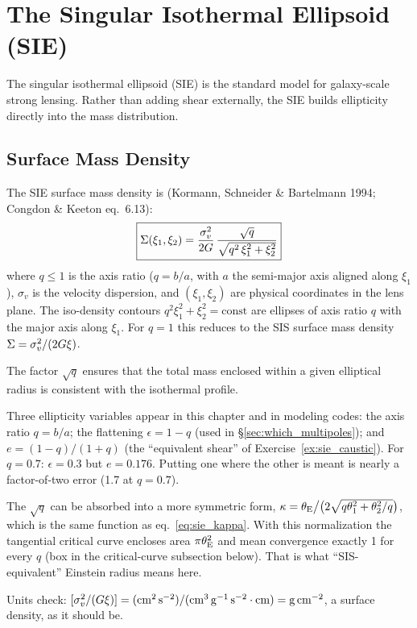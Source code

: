 \section{The Singular Isothermal Ellipsoid (SIE)}
\label{sec:sie}

The singular isothermal ellipsoid (SIE) is the standard
model for galaxy-scale strong lensing.  Rather than adding shear
externally, the SIE builds ellipticity directly into the mass
distribution.

\subsection{Surface Mass Density}

The SIE surface mass density is
(Kormann, Schneider \& Bartelmann 1994; Congdon \& Keeton eq.~6.13):
\begin{equation}
    \boxed{
    \Sigma(\xi_1, \xi_2)
    = \frac{\sigma_v^2}{2G}
    \,\frac{\sqrt{q}}{\sqrt{q^2\,\xi_1^2 + \xi_2^2}}
    }
    \label{eq:sie_sigma}
\end{equation}
where $q \leq 1$ is the axis ratio ($q = b/a$, with $a$ the
semi-major axis aligned along $\xi_1$), $\sigma_v$ is the velocity
dispersion, and $(\xi_1, \xi_2)$ are physical coordinates in the
lens plane.  The iso-density contours $q^2\xi_1^2 + \xi_2^2 =
\mathrm{const}$ are ellipses of axis ratio $q$ with the major axis
along $\xi_1$.  For $q = 1$ this reduces to the SIS surface mass
density $\Sigma = \sigma_v^2/(2G\xi)$.

The factor $\sqrt{q}$ ensures that the total mass enclosed within a
given elliptical radius is consistent with the isothermal profile.

\begin{annotation}
Three ellipticity variables appear in this chapter and in modeling codes: the
axis ratio $q = b/a$; the flattening $\epsilon = 1-q$ (used in
\S\ref{sec:which_multipoles}); and $e = (1-q)/(1+q)$ (the ``equivalent shear''
of Exercise~\ref{ex:sie_caustic}).  For $q = 0.7$: $\epsilon = 0.3$ but
$e = 0.176$.  Putting one where the other is meant is nearly a factor-of-two error (1.7 at $q = 0.7$).

The $\sqrt{q}$ can be absorbed into a more symmetric form,
$\kappa = \theta_{\mathrm{E}}\big/\big(2\sqrt{q\theta_1^2 + \theta_2^2/q}\big)$, which is
the same function as eq.~\eqref{eq:sie_kappa}.  With this normalization the
tangential critical curve encloses area $\pi\theta_{\mathrm{E}}^2$ and mean convergence
exactly 1 for every $q$ (box in the critical-curve subsection below).  That is
what ``SIS-equivalent'' Einstein radius means here.

Units check: $[\sigma_v^2/(G\xi)] =
(\mathrm{cm^2\,s^{-2}})/(\mathrm{cm^3\,g^{-1}\,s^{-2}}\cdot\mathrm{cm}) =
\mathrm{g\,cm^{-2}}$, a surface density, as it should be.
\end{annotation}


